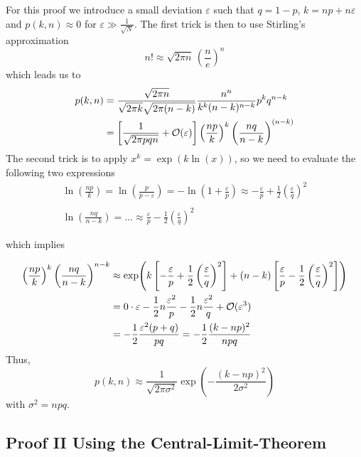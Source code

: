 \documentclass{notebook}
\begin{document}
For this proof we introduce a small deviation $\varepsilon$ such that $q = 1-p$, $k = np + n \varepsilon$ and $p(k,n) \approx 0$ for $\varepsilon \gg \frac{1}{\sqrt{N}}$. The first trick is then to use Stirling's approximation 
%
\begin{equation}
n! \approx \sqrt{2\pi n} \, \left( \frac{n}{e} \right)^n
\end{equation}
%
which leads us to
%
\begin{align*}
	p(k,n) &= \frac{\sqrt{2\pi n}}{\sqrt{2\pi k}\sqrt{2\pi (n-k)}} \frac{n^n}{k^k (n-k)^{n-k}} p^k q^{n-k}  \\
	&= \left[\frac{1}{\sqrt{2 \pi p q n}} + \mathcal{O}(\varepsilon) \right] \left( \frac{np}{k} \right)^k \left( \frac{nq}{n-k} \right)^{(n-k)}	
\end{align*}
%
The second trick is to apply $x^k = \exp(k \ln(x))$, so we need to evaluate the following two expressions
%
\begin{gather*}
	\ln(\frac{np}{k}) = \ln(\frac{p}{p-\varepsilon}) = -\ln(1+\frac{\varepsilon}{p}) \approx - \frac{\varepsilon}{p} + \frac{1}{2} \left( \frac{\varepsilon}{q} \right)^2 \\ \\
	\ln(\frac{nq}{n-k}) = \hdots \approx \frac{\varepsilon}{p} - \frac{1}{2} \left( \frac{\varepsilon}{q} \right)^2
\end{gather*}
%

which implies

%
\begin{align*}
	\left( \frac{np}{k} \right)^k \left( \frac{nq}{n-k} \right)^{n-k} &\approx \exp(k \left[ - \frac{\varepsilon}{p} + \frac{1}{2} \left( \frac{\varepsilon}{q} \right)^2 \right] + (n-k) \left[ \frac{\varepsilon}{p} - \frac{1}{2} \left( \frac{\varepsilon}{q} \right)^2 \right]) \\
	&= 0 \cdot \varepsilon - \frac{1}{2} n \frac{\varepsilon^2}{p} - \frac{1}{2} n \frac{\varepsilon^2}{q} + \mathcal{O}(\varepsilon^3) \\
	&= - \frac{1}{2} \frac{\varepsilon^2(p+q)}{pq} = -\frac{1}{2} \frac{(k-np)^2}{npq}
\end{align*}
%
Thus,
%
\begin{equation}
p(k,n) \approx \frac{1}{\sqrt{2 \pi \sigma^2}} \exp(-\frac{(k-np)^2}{2 \sigma^2})
\end{equation}
%
with $\sigma^2 = npq$.

\subsection*{Proof II Using the Central-Limit-Theorem}
\end{document}
